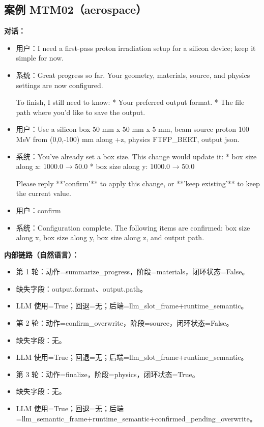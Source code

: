 \documentclass[11pt]{ctexart}
\begin{document}
\subsection{案例 MTM02（aerospace）}
\textbf{对话：}
\begin{itemize}
\item 用户：I need a first-pass proton irradiation setup for a silicon device; keep it simple for now.
\item 系统：Great progress so far. Your geometry, materials, source, and physics settings are now configured.

To finish, I still need to know:
*   Your preferred output format.
*   The file path where you'd like to save the output.
\item 用户：Use a silicon box 50 mm x 50 mm x 5 mm, beam source proton 100 MeV from (0,0,-100) mm along +z, physics FTFP\_BERT, output json.
\item 系统：You've already set a box size. This change would update it:
*   box size along x: 1000.0 → 50.0
*   box size along y: 1000.0 → 50.0

Please reply **'confirm'** to apply this change, or **'keep existing'** to keep the current value.
\item 用户：confirm
\item 系统：Configuration complete. The following items are confirmed: box size along x, box size along y, box size along z, and output path.
\end{itemize}
\textbf{内部链路（自然语言）：}
\begin{itemize}
\item 第 1 轮：动作=summarize\_progress，阶段=materials，闭环状态=False。
\item 缺失字段：output.format、output.path。
\item LLM 使用=True；回退=无；后端=llm\_slot\_frame+runtime\_semantic。
\item 第 2 轮：动作=confirm\_overwrite，阶段=source，闭环状态=False。
\item 缺失字段：无。
\item LLM 使用=True；回退=无；后端=llm\_slot\_frame+runtime\_semantic。
\item 第 3 轮：动作=finalize，阶段=physics，闭环状态=True。
\item 缺失字段：无。
\item LLM 使用=True；回退=无；后端=llm\_semantic\_frame+runtime\_semantic+confirmed\_pending\_overwrite。
\end{itemize}
\end{document}
